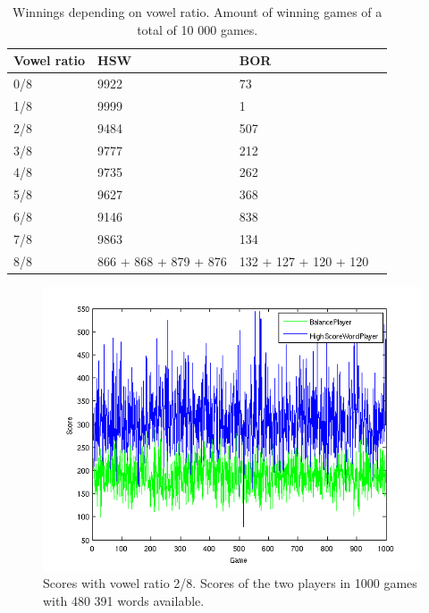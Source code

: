 \documentclass[a4paper, 12pt]{report}
\begin{document}
\begin{table}
\centering
    \begin{tabular}{ | l | l | l | p{5cm} |}
    \hline
   	Vowel ratio & HSW & BOR \\ \hline
	0/8 & 9922 & 73 \\ \hline
    	1/8 & 9999  & 1\\ \hline
    	2/8 & 9484 & 507 \\ \hline
    	3/8 & 9777 & 212\\ \hline
	4/8 & 9735 & 262 \\ \hline
	5/8 & 9627 & 368 \\ \hline
	6/8 & 9146 & 838 \\ \hline
	7/8 & 9863 & 134 \\ \hline
	8/8 & 866 + 868 + 879 + 876 & 132 + 127 + 120 + 120 \\ \hline
    \end{tabular}
\caption{Winnings depending on vowel ratio. Amount of winning games of a total of 10 000 games.}
\label{tab:bor+hsw}
\end{table}

\begin{figure}
\centering
\includegraphics[scale=0.5]{High_BalanceOnly2pen2vow_1000games}
\caption {Scores with vowel ratio 2/8. Scores of the two players in 1000 games with 480 391 words available.}
\label{fig:smallDict}
\end {figure}
\end{document}
